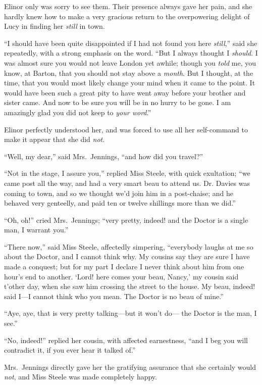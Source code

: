 \documentclass{article}
\begin{document}
Elinor only was sorry to see them.  Their presence
always gave her pain, and she hardly knew how to make
a very gracious return to the overpowering delight of Lucy
in finding her \emph{still} in town.

``I should have been quite disappointed if I had not
found you here \emph{still},'' said she repeatedly, with a strong
emphasis on the word.  ``But I always thought I \emph{should}.
I was almost sure you would not leave London yet awhile;
though you \emph{told} me, you know, at Barton, that you should
not stay above a \emph{month}.  But I thought, at the time,
that you would most likely change your mind when it came
to the point.  It would have been such a great pity
to have went away before your brother and sister came.
And now to be sure you will be in no hurry to be gone.
I am amazingly glad you did not keep to \emph{your word}.''

Elinor perfectly understood her, and was forced
to use all her self-command to make it appear that she
did \emph{not}.

``Well, my dear,'' said Mrs.\ Jennings, ``and how did
you travel?''

``Not in the stage, I assure you,'' replied Miss Steele,
with quick exultation; ``we came post all the way, and had
a very smart beau to attend us.  Dr. Davies was coming
to town, and so we thought we'd join him in a post-chaise;
and he behaved very genteelly, and paid ten or twelve
shillings more than we did.''

``Oh, oh!'' cried Mrs.\ Jennings; ``very pretty,
indeed! and the Doctor is a single man, I warrant you.''

``There now,'' said Miss Steele, affectedly simpering,
``everybody laughs at me so about the Doctor, and I
cannot think why.  My cousins say they are sure I have
made a conquest; but for my part I declare I never think
about him from one hour's end to another.  `Lord! here
comes your beau, Nancy,' my cousin said t'other day,
when she saw him crossing the street to the house.
My beau, indeed! said I---I cannot think who you mean.
The Doctor is no beau of mine.''

``Aye, aye, that is very pretty talking---but it won't do---%
the Doctor is the man, I see.''

``No, indeed!'' replied her cousin, with affected earnestness,
``and I beg you will contradict it, if you ever hear it talked
of.''

Mrs.\ Jennings directly gave her the gratifying
assurance that she certainly would \emph{not}, and Miss Steele
was made completely happy.
\end{document}

